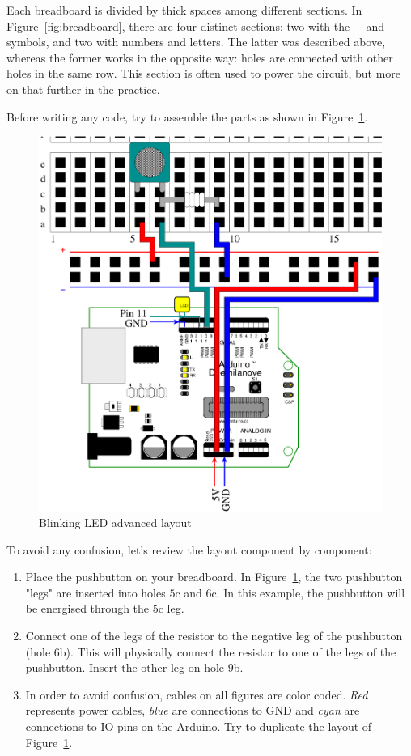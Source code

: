 Each breadboard is divided by thick spaces among different sections. In Figure~\ref{fig:breadboard}, there are four distinct sections: two with the $+$ and $-$ symbols, and two with numbers and letters. The latter was described above, whereas the former works in the opposite way: holes are connected with other holes in the same row. This section is often used to power the circuit, but more on that further in the practice.

Before writing any code, try to assemble the parts as shown in Figure~\ref{fig:blinkingLEDAdvancedLayout}.

\begin{figure}[htbp]
  \centering
  \includegraphics[width=0.9\linewidth]{figures/blinkingLEDAdvanced-scaled.eps}
  \caption{Blinking LED advanced layout
  \label{fig:blinkingLEDAdvancedLayout}}
\end{figure}

To avoid any confusion, let's review the layout component by component:

\begin{enumerate}
	\item Place the pushbutton on your breadboard. In Figure~\ref{fig:blinkingLEDAdvancedLayout}, the two pushbutton "legs" are inserted into holes $5$c and $6$c. In this example, the pushbutton will be energised through the $5$c leg.
	\item Connect one of the legs of the resistor to the negative leg of the pushbutton (hole $6$b). This will physically connect the resistor to one of the legs of the pushbutton. Insert the other leg on hole $9$b.
	\item In order to avoid confusion, cables on all figures are color coded. \emph{Red} represents power cables, \emph{blue} are connections to GND and \emph{cyan} are connections to IO pins on the Arduino. Try to duplicate the layout of Figure~\ref{fig:blinkingLEDAdvancedLayout}.
\end{enumerate}

